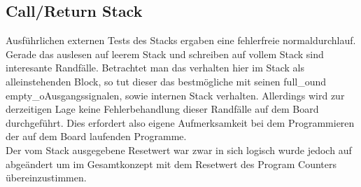 \documentclass{scrartcl}
\begin{document}
\subsection{Call/Return Stack}
Ausführlichen externen Tests des Stacks ergaben eine fehlerfreie normaldurchlauf. Gerade das auslesen auf leerem Stack und schreiben auf vollem Stack sind interesante Randfälle. Betrachtet man das verhalten hier im Stack als alleinstehenden Block, so tut dieser das bestmögliche mit seinen \glqq full\_o\grqq und \glqq empty\_o\grqq Ausgangssignalen, sowie internen Stack verhalten. Allerdings wird zur derzeitigen Lage keine Fehlerbehandlung dieser Randfälle auf dem Board durchgeführt. Dies erfordert also eigene Aufmerksamkeit bei dem Programmieren der auf dem Board laufenden Programme. \\
Der vom Stack ausgegebene Resetwert war zwar in sich logisch wurde jedoch auf \grqq abgeändert um im Gesamtkonzept mit dem Resetwert des Program Counters übereinzustimmen.
\end{document}
